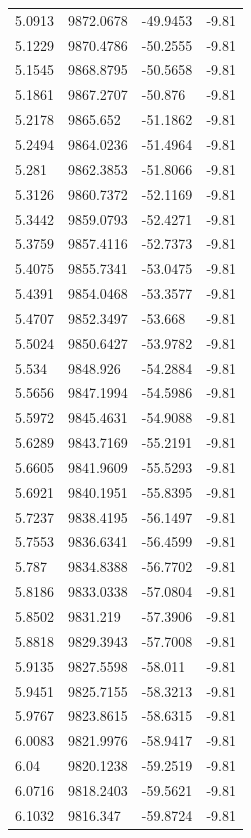 \begin{table}[H]
\begin{tabular}{llll}
5.0913 & 9872.0678 & -49.9453 & -9.81 \\
5.1229 & 9870.4786 & -50.2555 & -9.81 \\
5.1545 & 9868.8795 & -50.5658 & -9.81 \\
5.1861 & 9867.2707 & -50.876 & -9.81 \\
5.2178 & 9865.652 & -51.1862 & -9.81 \\
5.2494 & 9864.0236 & -51.4964 & -9.81 \\
5.281 & 9862.3853 & -51.8066 & -9.81 \\
5.3126 & 9860.7372 & -52.1169 & -9.81 \\
5.3442 & 9859.0793 & -52.4271 & -9.81 \\
5.3759 & 9857.4116 & -52.7373 & -9.81 \\
5.4075 & 9855.7341 & -53.0475 & -9.81 \\
5.4391 & 9854.0468 & -53.3577 & -9.81 \\
5.4707 & 9852.3497 & -53.668 & -9.81 \\
5.5024 & 9850.6427 & -53.9782 & -9.81 \\
5.534 & 9848.926 & -54.2884 & -9.81 \\
5.5656 & 9847.1994 & -54.5986 & -9.81 \\
5.5972 & 9845.4631 & -54.9088 & -9.81 \\
5.6289 & 9843.7169 & -55.2191 & -9.81 \\
5.6605 & 9841.9609 & -55.5293 & -9.81 \\
5.6921 & 9840.1951 & -55.8395 & -9.81 \\
5.7237 & 9838.4195 & -56.1497 & -9.81 \\
5.7553 & 9836.6341 & -56.4599 & -9.81 \\
5.787 & 9834.8388 & -56.7702 & -9.81 \\
5.8186 & 9833.0338 & -57.0804 & -9.81 \\
5.8502 & 9831.219 & -57.3906 & -9.81 \\
5.8818 & 9829.3943 & -57.7008 & -9.81 \\
5.9135 & 9827.5598 & -58.011 & -9.81 \\
5.9451 & 9825.7155 & -58.3213 & -9.81 \\
5.9767 & 9823.8615 & -58.6315 & -9.81 \\
6.0083 & 9821.9976 & -58.9417 & -9.81 \\
6.04 & 9820.1238 & -59.2519 & -9.81 \\
6.0716 & 9818.2403 & -59.5621 & -9.81 \\
6.1032 & 9816.347 & -59.8724 & -9.81 \\

\end{tabular}
\end{table}
